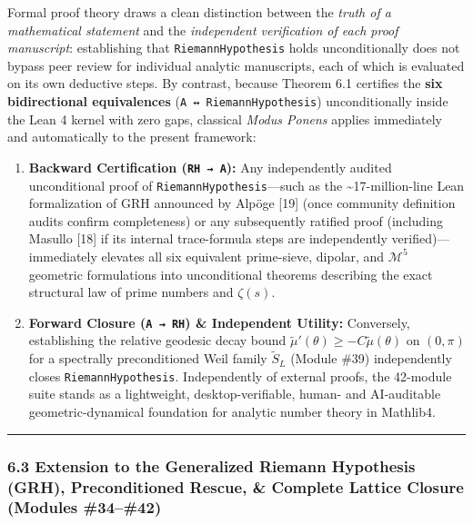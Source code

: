 \documentclass[
  11pt,
]{article}
\providecommand{\tightlist}{%
  \setlength{\itemsep}{0pt}\setlength{\parskip}{0pt}}
\begin{document}
Formal proof theory draws a clean distinction between the \emph{truth of
a mathematical statement} and the \emph{independent verification of each
proof manuscript}: establishing that \texttt{RiemannHypothesis} holds
unconditionally does not bypass peer review for individual analytic
manuscripts, each of which is evaluated on its own deductive steps. By
contrast, because Theorem 6.1 certifies the \textbf{six bidirectional
equivalences} (\texttt{A\ ↔\ RiemannHypothesis}) unconditionally inside
the Lean 4 kernel with zero gaps, classical \emph{Modus Ponens} applies
immediately and automatically to the present framework:

\begin{enumerate}
\def\labelenumi{\arabic{enumi}.}
\tightlist
\item
  \textbf{Backward Certification (\texttt{RH\ →\ A}):} Any independently
  audited unconditional proof of \texttt{RiemannHypothesis}---such as
  the \textasciitilde17-million-line Lean formalization of GRH announced
  by Alpöge {[}19{]} (once community definition audits confirm
  completeness) or any subsequently ratified proof (including Masullo
  {[}18{]} if its internal trace-formula steps are independently
  verified)---immediately elevates all six equivalent prime-sieve,
  dipolar, and \(\mathcal{M}^5\) geometric formulations into
  unconditional theorems describing the exact structural law of prime
  numbers and \(\zeta(s)\).
\item
  \textbf{Forward Closure (\texttt{A\ →\ RH}) \& Independent Utility:}
  Conversely, establishing the relative geodesic decay bound
  \(\tilde{\mu}'(\theta) \ge -C\tilde{\mu}(\theta)\) on \((0,\pi)\) for
  a spectrally preconditioned Weil family \(\widetilde{S}_L\) (Module
  \#39) independently closes \texttt{RiemannHypothesis}. Independently
  of external proofs, the 42-module suite stands as a lightweight,
  desktop-verifiable, human- and AI-auditable geometric-dynamical
  foundation for analytic number theory in Mathlib4.
\end{enumerate}

\begin{center}\rule{0.5\linewidth}{0.5pt}\end{center}

\subsubsection{6.3 Extension to the Generalized Riemann Hypothesis
(GRH), Preconditioned Rescue, \& Complete Lattice Closure (Modules
\#34--\#42)}\label{extension-to-the-generalized-riemann-hypothesis-grh-preconditioned-rescue-complete-lattice-closure-modules-3442}
\end{document}
